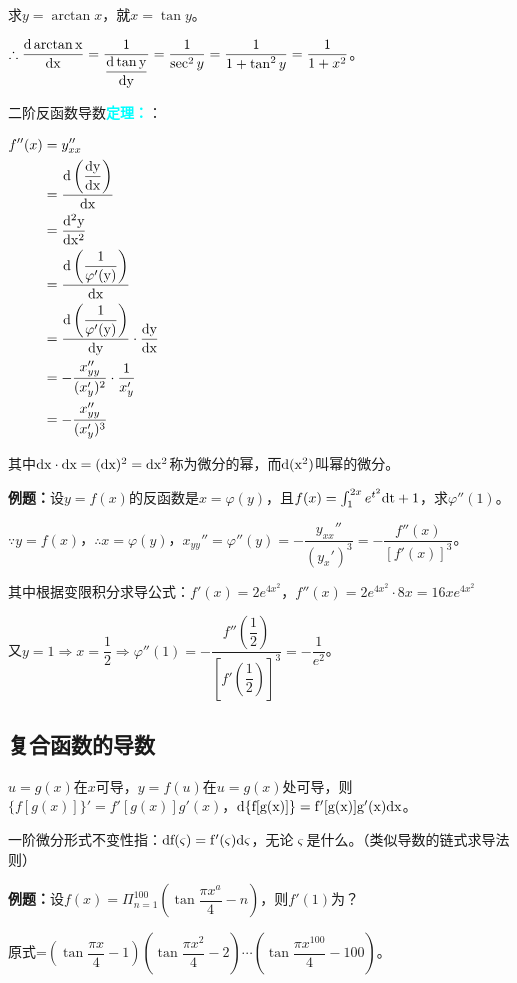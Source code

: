 \documentclass[UTF8, 12pt]{ctexart}
\begin{document}
求$y=\arctan x$，就$x=\tan y$。

$\therefore\dfrac{\rm{d}\arctan x}{\rm{d}x}=\dfrac{1}{\dfrac{\rm{d}\tan y}{\rm{d}y}}=\dfrac{1}{\sec^2y}=\dfrac{1}{1+\tan^2y}=\dfrac{1}{1+x^2}$。

二阶反函数导数\textcolor{aqua}{\textbf{定理：}}：

$
\begin{aligned}
    f''(x) &=y''_{xx} \\
    & =\dfrac{\rm{d}\left(\dfrac{\rm{d}y}{\rm{d}x}\right)}{\rm{d}x} \\
    & =\dfrac{\rm{d}^2y}{\rm{d}x^2} \\
    & =\dfrac{\rm{d}\left(\dfrac{1}{\varphi'(y)}\right)}{\rm{d}x} \\
    & =\dfrac{\rm{d}\left(\dfrac{1}{\varphi'(y)}\right)}{\rm{d}y}\cdot\dfrac{\rm{d}y}{\rm{d}x} \\
    & =-\dfrac{x_{yy}''}{(x_y')^2}\cdot\dfrac{1}{x_y'} \\
    & =-\dfrac{x_{yy}''}{(x_y')^3}
\end{aligned}
$

其中$\rm{d}x\cdot\rm{d}x=(\rm{d}x)^2=\rm{d}x^2$称为微分的幂，而$\rm{d}(x^2)$叫幂的微分。

\textbf{例题：}设$y=f(x)$的反函数是$x=\varphi(y)$，且$f(x)=\int_1^{2x}e^{t^2}\rm{d}t+1$，求$\varphi''(1)$。

$\because y=f(x)$，$\therefore x=\varphi(y)$，$x_{yy}''=\varphi''(y)=-\dfrac{y_{xx}''}{(y_x')^3}=-\dfrac{f''(x)}{[f'(x)]^3}$。

其中根据变限积分求导公式：$f'(x)=2e^{4x^2}$，$f''(x)=2e^{4x^2}\cdot 8x=16xe^{4x^2}$

又$y=1\Rightarrow x=\dfrac{1}{2}\Rightarrow\varphi''(1)=-\dfrac{f''\left(\dfrac{1}{2}\right)}{\left[f'\left(\dfrac{1}{2}\right)\right]^3}=-\dfrac{1}{e^2}$。

\subsection{复合函数的导数}

$u=g(x)$在$x$可导，$y=f(u)$在$u=g(x)$处可导，则$\{f[g(x)]\}'=f'[g(x)]g'(x)$，$\rm{d}\{f[g(x)]\}=f'[g(x)]g'(x)\rm{d}x$。

一阶微分形式不变性指：$\rm{d}f(\varsigma)=f'(\varsigma)\rm{d}\varsigma$，无论$\varsigma$是什么。（类似导数的链式求导法则）

\textbf{例题：}设$f(x)=\Pi_{n=1}^{100}\left(\tan\dfrac{\pi x^a}{4}-n\right)$，则$f'(1)$为？

原式=$\left(\tan\dfrac{\pi x}{4}-1\right)\left(\tan\dfrac{\pi x^2}{4}-2\right)\cdots\left(\tan\dfrac{\pi x^100}{4}-100\right)$。
\end{document}
